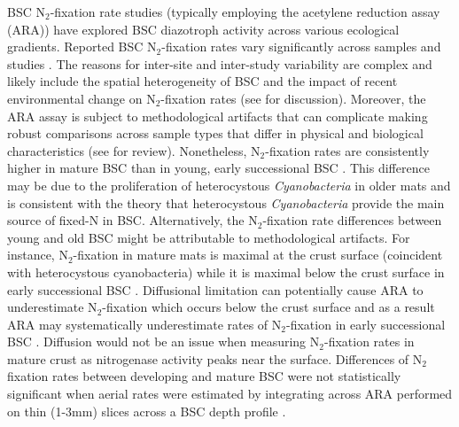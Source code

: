 BSC N$_{2}$-fixation rate studies (typically employing the acetylene reduction
assay (ARA)) have explored BSC diazotroph activity across various ecological
gradients. Reported BSC N$_{2}$-fixation rates vary significantly across
samples and studies \citep{Evans_2001}.  The reasons for inter-site and
inter-study variability are complex and likely include the spatial
heterogeneity of BSC \citep{Evans_2001} and the impact of recent environmental
change on N$_{2}$-fixation rates (see \citet{Belnap_2001} for discussion).
Moreover, the ARA assay is subject to methodological artifacts that can
complicate making robust comparisons across sample types that differ in
physical and biological characteristics (see \citet{Belnap_2001} for review).
Nonetheless, N$_{2}$-fixation rates are consistently higher in mature BSC than
in young, early successional BSC \citep{Belnap_2002, 14766579}. This difference
may be due to the proliferation of heterocystous \textit{Cyanobacteria} in
older mats and is consistent with the theory that heterocystous
\textit{Cyanobacteria} provide the main source of fixed-N in BSC.
Alternatively, the N$_{2}$-fixation rate differences between young and old BSC
might be attributable to methodological artifacts.  For instance,
N$_{2}$-fixation in mature mats is maximal at the crust surface (coincident
with heterocystous cyanobacteria) while it is maximal below the crust surface
in early successional BSC \citep{15643930}. Diffusional limitation can
potentially cause ARA to underestimate N$_{2}$-fixation which occurs below the
crust surface and as a result ARA may systematically underestimate rates of
N$_{2}$-fixation in early successional BSC \citep{15643930}. Diffusion would
not be an issue when measuring N$_{2}$-fixation rates in mature crust as
nitrogenase activity peaks near the surface.  Differences of N$_{2}$ fixation
rates between developing and mature BSC were not statistically significant when
aerial rates were estimated by integrating across ARA performed on thin (1-3mm)
slices across a BSC depth profile \citep{15643930}.

